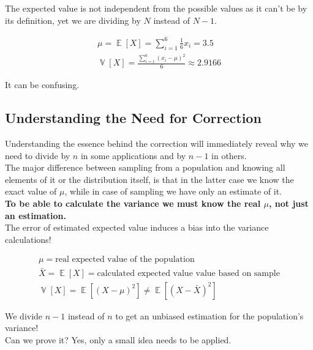 \documentclass[12pt, a4paper, twoside]{article}
\DeclareMathOperator{\srexpop}{\mathbb{E}}
\DeclareMathOperator{\srexvar}{\mathbb{V}}
\newcommand\srexp[1]{\srexpop\left[#1\right]}
\newcommand\srvar[1]{\srexvar\left[#1\right]}
\begin{document}
The expected value is not independent from the possible values as it can't be by its definition, yet we are dividing
by $N$ instead of $N -1$.

\begin{gather*}
	\mu = \srexp{X} = \sum_{i=1}^{6}\frac{1}{6}x_i = 3.5\\[1em]
	\srvar{X} = \frac{\sum_{i=1}^{6}(x_i - \mu)^2}{6} \approx 2.9166
\end{gather*}

It can be confusing.


\subsection*{Understanding the Need for Correction}

Understanding the essence behind the correction will immediately reveal why we need to divide by
$n$ in some applications and by $n-1$ in others.\\

The major difference between sampling from a population and knowing all elements of it or the distribution itself, is that in the latter case we know the exact value of $\mu$, while in case of sampling we have only an estimate of it.\\
\textbf{To be able to calculate the variance we must know the real $\mu$, not just an estimation.}\\
The error of estimated expected value induces a bias into the variance calculations!

\begin{gather*}
	\mu = \text{real expected value of the population} \\[1em]
	\bar{X} = \srexp{X} = \text{calculated expected value value based on sample} \\[1em]
	\srvar{X} = \srexp{(X - \mu)^2} \neq \srexp{(X - \bar{X})^2}
\end{gather*}

We divide $n-1$ instead of $n$ to get an unbiased estimation for the population's variance!\\
Can we prove it? Yes, only a small idea needs to be applied.

\begin{figure}[H]
\centering
{}
\end{figure}
\end{document}
